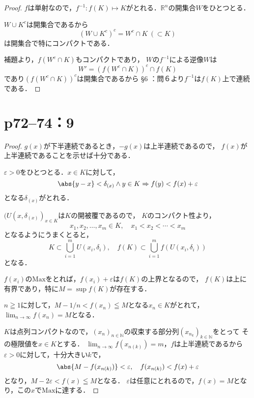 \documentclass[a4paper,10pt,fleqn]{ltjsarticle}
\begin{document}
\begin{tleftbar}
    \begin{proof}
        $f$は単射なので，$f^{-1} \colon f(K) \mapsto K$がとれる．$\mathbb{R}^n$の開集合$W$をひとつとる．

        $W \cup K^c$は開集合であるから
        \[
            (W \cup K^c)^c = W^c \cap K~(\subset K)
        \]
        は開集合で特にコンパクトである．

        補題より，$f(W^c \cap K)$もコンパクトであり，
        $W$の$f^{-1}$による逆像$W$は
        \[
            W' = (f(W^c \cap K))^c \cap f(K)
        \]
        であり$(f(W^c \cap K))^c$は開集合であるから
        \S 6 ：問６より$f^{-1}$は$f(K)$上で連続である．
    \end{proof}
\end{tleftbar}

\newpage

\section*{p72--74：9}

\begin{tleftbar}
    \begin{proof}
        $g(x)$が下半連続であるとき，$-g(x)$は上半連続であるので，
        $f(x)$が上半連続であることを示せば十分である．

        $\varepsilon >0$をひとつとる．$ x\in K$に対して，
        \[
            \abs{y-x} < \delta_{(x)} \land y \in K \Rightarrow f(y) < f(x) + \varepsilon
        \]
        となる$\delta_{(x)}$がとれる．

        $(U(x,\delta_{(x)})_{x\in K}$は$K$の開被覆であるので，
        $K$のコンパクト性より，
        \[
            x_1 , x_2, \ldots , x_m \in K , \quad x_1 < x_2 < \cdots < x_m
        \]
        となるようにうまくとると，
        \[
            K \subset \bigcup_{i=1}^m U(x_i,\delta_i) ,\quad f(K) \subset \bigcup_{i=1}^m f(U(x_i,\delta_i))
        \]
        となる．

        $f(x_i)$の$\mathrm{Max}$をとれば，$f(x_i)+\varepsilon$は$f(K)$の上界となるので，
        $f(K)$は上に有界であり，特に$M = \sup f(K)$が存在する．

        $n \geqq 1$に対して，$ M - 1/n < f(x_n) \leqq M$となる$x_n \in K$がとれて，
        $\lim_{n \to \infty} f(x_n) = M$となる．

        $K$は点列コンパクトなので，$(x_n)_{n \in \mathbb{N}}$の収束する部分列$(x_{n_k})_{k \in \mathbb{N}}$をとって
        その極限値を$ x\in K$とする．
        $\lim_{n \to \infty} f(x_{n(k)})=m$，$f$は上半連続であるから
        $\varepsilon >0$に対して，十分大きい$k$で，
        \[
            \abs{M-f(x_{n(k)})} < \varepsilon,\quad f(x_{n(k)})<f(x)+\varepsilon
        \]
        となり，$M-2 \varepsilon < f(x) \leqq M $となる．
        $\varepsilon$は任意にとれるので，$f(x) = M$となり，この$x$で$\mathrm{Max}$に達する．
    \end{proof}
\end{tleftbar}
\end{document}
